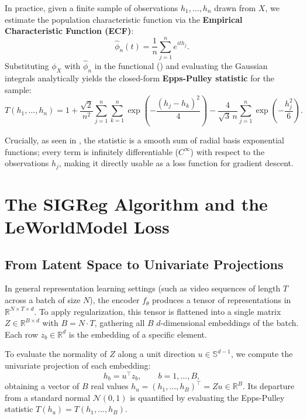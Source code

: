 \documentclass[11pt, oneside, openany]{book}
\begin{document}
In practice, given a finite sample of observations $h_{1}, \dots, h_{n}$ drawn from $X$, we estimate the population characteristic function via the \textbf{Empirical Characteristic Function (ECF)}:
\begin{equation}
\label{eq:7.5}
\hat{\phi}_{n}(t) = \frac{1}{n} \sum_{j=1}^{n} e^{ith_{j}}.
\end{equation}
Substituting $\phi_{X}$ with $\hat{\phi}_{n}$ in the functional () and evaluating the Gaussian integrals analytically yields the closed-form \textbf{Epps-Pulley statistic} for the sample:
\begin{equation}
\label{eq:7.6}
T(h_{1}, \dots, h_{n}) = 1 + \frac{\sqrt{2}}{n^{2}} \sum_{j=1}^{n} \sum_{k=1}^{n} \exp\left( -\frac{(h_{j} - h_{k})^{2}}{4} \right) - \frac{4}{\sqrt{3}\,n} \sum_{j=1}^{n} \exp\left( -\frac{h_{j}^{2}}{6} \right).
\end{equation}

Crucially, as seen in , the statistic is a smooth sum of radial basis exponential functions; every term is infinitely differentiable ($C^{\infty}$) with respect to the observations $h_{j}$, making it directly usable as a loss function for gradient descent.

\section{The SIGReg Algorithm and the LeWorldModel Loss}
\label{sec:7.3}

\subsection{From Latent Space to Univariate Projections}
\label{sec:7.3.1}

In general representation learning settings (such as video sequences of length $T$ across a batch of size $N$), the encoder $f_{\theta}$ produces a tensor of representations in $\mathbb{R}^{N \times T \times d}$. To apply regularization, this tensor is flattened into a single matrix $Z \in \mathbb{R}^{B \times d}$ with $B = N \cdot T$, gathering all $B$ $d$-dimensional embeddings of the batch. Each row $z_{b} \in \mathbb{R}^{d}$ is the embedding of a specific element.

To evaluate the normality of $Z$ along a unit direction $u \in \mathbb{S}^{d-1}$, we compute the univariate projection of each embedding:
\begin{equation}
\label{eq:7.7}
h_{b} = u^{\top} z_{b}, \qquad b = 1, \dots, B,
\end{equation}
obtaining a vector of $B$ real values $h_{u} = (h_{1}, \dots, h_{B})^{\top} = Z u \in \mathbb{R}^{B}$. Its departure from a standard normal $\mathcal{N}(0, 1)$ is quantified by evaluating the Epps-Pulley statistic $T(h_{u}) = T(h_{1}, \dots, h_{B})$.
\end{document}
